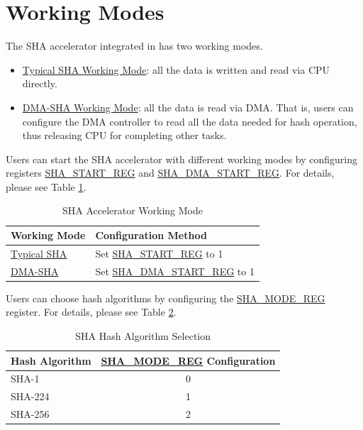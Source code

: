 \documentclass[main\_\_EN.tex]{subfiles}
\begin{document}
\section{Working Modes}
The SHA accelerator integrated in \chipname{} has two working modes.

\begin{itemize}
    \item \hyperref[sec:sha-typical-sha]{Typical SHA Working Mode}: all the data is written and read via CPU directly.
    \item \hyperref[sec:sha-dma-sha]{DMA-SHA Working Mode}: all the data is read via DMA. That is, users can configure the DMA controller to read all the data needed for hash operation, thus releasing CPU for completing other tasks.
\end{itemize}    

Users can start the SHA accelerator with different working modes by configuring registers \hyperref[regdesc:SHASTARTREG]{SHA\_START\_REG} and \hyperref[regdesc:SHADMASTARTREG]{SHA\_DMA\_START\_REG}. For details, please see Table \ref{tab:sha-working-mode}.
\begin{longtable}[c]{ | l | l | }
\caption{SHA Accelerator Working Mode}
\label{tab:sha-working-mode}
\\\hline 
\rowcolor{lightgray}
Working Mode      & Configuration Method\\
    \hline
    \hyperref[sec:sha-typical-sha]{Typical SHA}      &  Set \hyperref[regdesc:SHASTARTREG]{SHA\_START\_REG} to 1   \\
    \hline
    \hyperref[sec:sha-dma-sha]{DMA-SHA}           &  Set \hyperref[regdesc:SHADMASTARTREG]{SHA\_DMA\_START\_REG} to 1   \\
    \hline
\end{longtable}

Users can choose hash algorithms by configuring the \hyperref[regdesc:SHAMODEREG]{SHA\_MODE\_REG} register. For details, please see Table \ref{tab:sha-hash-algo-select}.

\begin{longtable}[c]{| l | c |}
\caption{SHA Hash Algorithm Selection}
\label{tab:sha-hash-algo-select}
\\\hline
\rowcolor{lightgray}
Hash Algorithm & \hyperref[regdesc:SHAMODEREG]{SHA\_MODE\_REG} Configuration\\
    \hline
    SHA-1 & 0\\
    \hline
    SHA-224 & 1\\
    \hline
    SHA-256 & 2 \\\hline 
\end{longtable}
\end{document}
